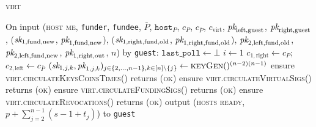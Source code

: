 \begin{center}
\begin{processbox}{\textsc{virt}}
\begin{algorithmic}[1]
      \State On input (\textsc{host me}, \texttt{funder}, \texttt{fundee},
      $\bar{P}$, $\texttt{host}_P$, $c_P$, $c_{\bar{P}}$, $c_{\mathrm{virt}}$,
      $\textit{pk}_{\mathrm{left}, \mathrm{guest}}$, $\textit{pk}_{\mathrm{right},
      \mathrm{guest}}$, ($\textit{sk}_{1, \mathrm{fund}, \mathrm{new}}$, $\textit{pk}_{1,
      \mathrm{fund}, \mathrm{new}}$), ($\textit{sk}_{1, \mathrm{right}, \mathrm{fund},
      \mathrm{old}}$, $\textit{pk}_{1, \mathrm{right}, \mathrm{fund}, \mathrm{old}}$),
      $\textit{pk}_{2, \mathrm{left}, \mathrm{fund}, \mathrm{old}}$, $\textit{pk}_{2,
      \mathrm{left}, \mathrm{fund}, \mathrm{new}}$, $\textit{pk}_{1, \mathrm{right},
      \mathrm{out}}$, $n$) by \texttt{guest}:
      \Indent
        \State $\texttt{last\_poll} \gets \bot$
        \State $i \gets 1$
        \State $c_{1, \mathrm{right}} \gets c_P$; $c_{2, \mathrm{left}} \gets
        c_{\bar{P}}$
        \label{code:virtual-layer:keys:host-me:set-i}
        \State $(\textit{sk}_{1, j, k}, \textit{pk}_{1, j, k})_{j \in \{2, \dots, n-1\}, k \in [n]
        \setminus \{j\}} \gets \textsc{keyGen}()^{(n-2)(n-1)}$
        \State ensure \textsc{virt.circulateKeysCoinsTimes}() returns
        (\textsc{ok})
        \State ensure \textsc{virt.circulateVirtualSigs}() returns (\textsc{ok})
        \State ensure \textsc{virt.circulateFundingSigs}() returns (\textsc{ok})
        \State ensure \textsc{virt.circulateRevocations}() returns (\textsc{ok})
        \State output (\textsc{hosts ready}, $p + \sum\limits_{j = 2}^{n-1}(s -
        1 + t_j)$) to \texttt{guest} 
      \EndIndent
    \end{algorithmic}
  \end{processbox}
  \label{code:virtual-layer:keys}
\end{center} \ \\

